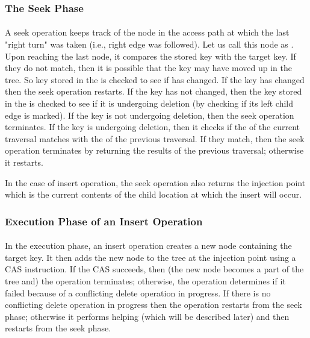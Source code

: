 \subsubsection{The Seek Phase} \paragraph{}
A seek operation keeps track of the node in the access path at which the last "right turn" was taken (i.e., right edge was followed). Let us call this node as \anchorNode. Upon reaching the last node, it compares the stored key with the target key. If they do not match, then it is possible that the key may have moved up in the tree. So key stored in the \anchorNode is checked to see if has changed. If the key has changed then the seek operation restarts. If the key has not changed, then the key stored in the \anchorNode is checked to see if it is undergoing deletion (by checking if its left child edge is marked). If the key is not undergoing deletion, then the seek operation terminates. If the key is undergoing deletion, then it checks if the \anchorNode of the current traversal matches with the \anchorNode of the previous traversal. If they match, then the seek operation terminates by returning the results of the previous traversal; otherwise it restarts.\par
In the case of insert operation, the seek operation also returns the injection point which is the current contents of the child location at which the insert will occur.

\subsubsection{Execution Phase of an Insert Operation} \paragraph{}
In the execution phase, an insert operation creates a new node containing the target key. It then adds the new node to the tree at the injection point using a CAS instruction. If the CAS succeeds, then (the new node becomes a part of the tree and) the operation terminates; otherwise, the operation determines if it failed because of a conflicting delete operation in progress. If there is no conflicting delete operation in progress then the operation restarts from the seek phase; otherwise it performs helping (which will be described later) and then restarts from the seek phase.

